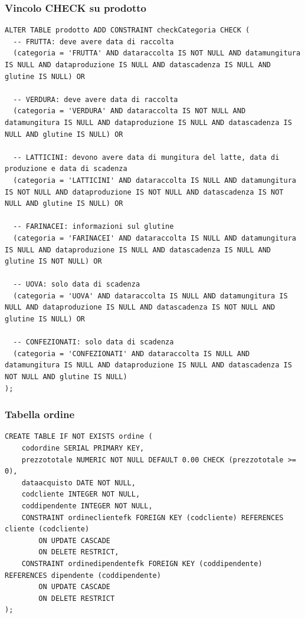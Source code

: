 \documentclass[a4paper,12pt]{article}
\begin{document}
\subsubsection*{Vincolo CHECK su prodotto}

\vspace{1.5em}
\begin{lstlisting}[style=sqlstyle]
ALTER TABLE prodotto ADD CONSTRAINT checkCategoria CHECK (
  -- FRUTTA: deve avere data di raccolta
  (categoria = 'FRUTTA' AND dataraccolta IS NOT NULL AND datamungitura IS NULL AND dataproduzione IS NULL AND datascadenza IS NULL AND glutine IS NULL) OR
  
  -- VERDURA: deve avere data di raccolta  
  (categoria = 'VERDURA' AND dataraccolta IS NOT NULL AND datamungitura IS NULL AND dataproduzione IS NULL AND datascadenza IS NULL AND glutine IS NULL) OR
  
  -- LATTICINI: devono avere data di mungitura del latte, data di produzione e data di scadenza
  (categoria = 'LATTICINI' AND dataraccolta IS NULL AND datamungitura IS NOT NULL AND dataproduzione IS NOT NULL AND datascadenza IS NOT NULL AND glutine IS NULL) OR
  
  -- FARINACEI: informazioni sul glutine
  (categoria = 'FARINACEI' AND dataraccolta IS NULL AND datamungitura IS NULL AND dataproduzione IS NULL AND datascadenza IS NULL AND glutine IS NOT NULL) OR
  
  -- UOVA: solo data di scadenza
  (categoria = 'UOVA' AND dataraccolta IS NULL AND datamungitura IS NULL AND dataproduzione IS NULL AND datascadenza IS NOT NULL AND glutine IS NULL) OR
  
  -- CONFEZIONATI: solo data di scadenza
  (categoria = 'CONFEZIONATI' AND dataraccolta IS NULL AND datamungitura IS NULL AND dataproduzione IS NULL AND datascadenza IS NOT NULL AND glutine IS NULL)
);
\end{lstlisting}
\vspace{1.5em}
\subsubsection*{Tabella ordine}

\vspace{1.5em}
\begin{lstlisting}[style=sqlstyle]
CREATE TABLE IF NOT EXISTS ordine (
    codordine SERIAL PRIMARY KEY,
    prezzototale NUMERIC NOT NULL DEFAULT 0.00 CHECK (prezzototale >= 0),
    dataacquisto DATE NOT NULL,
    codcliente INTEGER NOT NULL,
    coddipendente INTEGER NOT NULL,
    CONSTRAINT ordineclientefk FOREIGN KEY (codcliente) REFERENCES cliente (codcliente)
        ON UPDATE CASCADE
        ON DELETE RESTRICT,
    CONSTRAINT ordinedipendentefk FOREIGN KEY (coddipendente) REFERENCES dipendente (coddipendente)
        ON UPDATE CASCADE
        ON DELETE RESTRICT
);
\end{lstlisting}
\vspace{1.5em}
\end{document}
